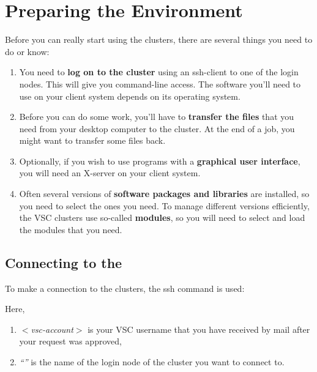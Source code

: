 \chapter{Preparing the Environment}
\label{ch:setting-up-the-environment}

Before you can really start using the \hpc clusters, there are several things you need to do or know:

\begin{enumerate}
\item  You need to \textbf{log on to the cluster} using an ssh-client to one of the login nodes. This will give you command-line access. The software you'll need to use on your client system depends on its operating system.
\item  Before you can do some work, you'll have to \textbf{transfer the files} that you need from your desktop computer to the cluster. At the end of a job, you might want to transfer some files back.
\item  Optionally, if you wish to use programs with a \textbf{graphical user interface}, you will need an X-server on your client system.
\item  Often several versions of \textbf{software packages and libraries} are installed, so you need to select the ones you need. To manage different versions efficiently, the VSC clusters use so-called \textbf{modules}, so you will need to select and load the modules that you need.
\end{enumerate}

\section{Connecting to the \hpc}

To make a connection to the \hpc clusters, the ssh command is used:

\begin{prompt}
\end{prompt}

Here,

\begin{enumerate}
\item  \textit{$<$vsc-account$>$} is your VSC username that you have received by mail after your request was approved,
\item  \textit{``\loginnode''} is the name of the login node of the \hpc cluster you want to connect to.
\end{enumerate}

